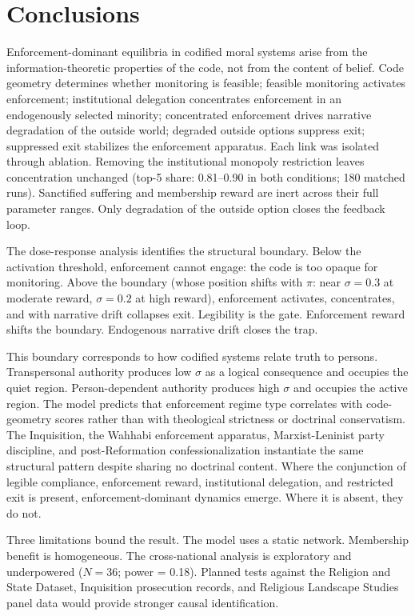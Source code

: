 \documentclass[12pt]{article}
\begin{document}
%
\section{Conclusions}

Enforcement-dominant equilibria in codified moral systems arise from
the information-theoretic properties of the code, not from the content
of belief. Code geometry determines whether monitoring is feasible;
feasible monitoring activates enforcement; institutional delegation
concentrates enforcement in an endogenously selected minority;
concentrated enforcement drives narrative degradation of the outside
world; degraded outside options suppress exit; suppressed exit stabilizes
the enforcement apparatus. Each link was isolated through ablation.
Removing the institutional monopoly restriction leaves concentration
unchanged (top-5 share: 0.81--0.90 in both conditions; 180 matched runs).
Sanctified suffering and membership reward are inert across their full
parameter ranges. Only degradation of the outside option closes the
feedback loop.

The dose-response analysis identifies the structural boundary. Below the
activation threshold, enforcement cannot engage: the code is too opaque
for monitoring. Above the boundary (whose position shifts with $\pi$:
near $\sigma = 0.3$ at moderate reward, $\sigma = 0.2$ at high reward),
enforcement activates, concentrates, and with narrative drift collapses
exit. Legibility is the gate. Enforcement reward shifts the boundary.
Endogenous narrative drift closes the trap.

This boundary corresponds to how codified systems relate truth to
persons. Transpersonal authority produces low $\sigma$ as a logical
consequence and occupies the quiet region. Person-dependent authority
produces high $\sigma$ and occupies the active region. The model predicts
that enforcement regime type correlates with code-geometry scores rather
than with theological strictness or doctrinal conservatism. The
Inquisition, the Wahhabi enforcement apparatus, Marxist-Leninist party
discipline, and post-Reformation confessionalization instantiate the same
structural pattern despite sharing no doctrinal content. Where the
conjunction of legible compliance, enforcement reward, institutional
delegation, and restricted exit is present, enforcement-dominant dynamics
emerge. Where it is absent, they do not.

Three limitations bound the result. The model uses a static network.
Membership benefit is homogeneous. The cross-national analysis is
exploratory and underpowered ($N = 36$; power = 0.18). Planned tests
against the Religion and State Dataset, Inquisition prosecution records,
and Religious Landscape Studies panel data would provide stronger causal
identification.
\end{document}
